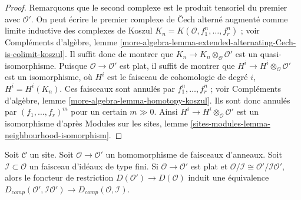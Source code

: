 \begin{proof}
Remarquons que le second complexe est le produit tensoriel du premier
avec $\mathcal{O}'$. On peut écrire le premier complexe
de {\v C}ech alterné augmenté comme limite inductive des complexes de Koszul
$K_n = K(\mathcal{O}, f_1^n, \ldots, f_r^n)$ ; voir
Compléments d'algèbre, lemme
\ref{more-algebra-lemma-extended-alternating-Cech-is-colimit-koszul}.
Il suffit donc de montrer que $K_n \to K_n \otimes_\mathcal{O} \mathcal{O}'$
est un quasi-isomorphisme. Puisque $\mathcal{O} \to \mathcal{O}'$ est plat,
il suffit de montrer que $H^i \to H^i \otimes_\mathcal{O} \mathcal{O}'$
est un isomorphisme, où $H^i$ est le faisceau de cohomologie de degré $i$,
$H^i = H^i(K_n)$. Ces faisceaux sont annulés par $f_1^n, \ldots, f_r^n$ ; voir
Compléments d'algèbre, lemme \ref{more-algebra-lemma-homotopy-koszul}.
Ils sont donc annulés par $(f_1, \ldots, f_r)^m$
pour un certain $m \gg 0$. Ainsi $H^i \to H^i \otimes_\mathcal{O} \mathcal{O}'$
est un isomorphisme d'après Modules sur les sites, lemme
\ref{sites-modules-lemma-neighbourhood-isomorphism}.
\end{proof}

\begin{lemma}
\label{lemma-restriction-derived-complete-equivalence}
Soit $\mathcal{C}$ un site. Soit $\mathcal{O} \to \mathcal{O}'$ un
homomorphisme de faisceaux d'anneaux. Soit $\mathcal{I} \subset \mathcal{O}$
un faisceau d'idéaux de type fini.
Si $\mathcal{O} \to \mathcal{O}'$ est plat et
$\mathcal{O}/\mathcal{I} \cong \mathcal{O}'/\mathcal{I}\mathcal{O}'$,
alors le foncteur de restriction $D(\mathcal{O}') \to D(\mathcal{O})$
induit une équivalence
$D_{comp}(\mathcal{O}', \mathcal{I}\mathcal{O}') \to
D_{comp}(\mathcal{O}, \mathcal{I})$.
\end{lemma}

